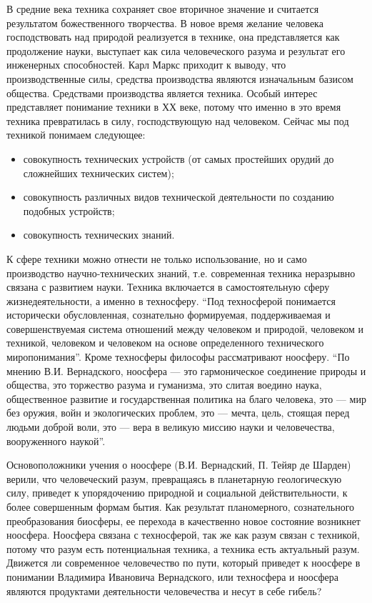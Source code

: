 В средние века техника сохраняет свое вторичное значение и считается результатом божественного творчества. В новое время желание человека господствовать над природой реализуется в технике, она представляется как продолжение науки, выступает как сила человеческого разума и результат его инженерных способностей. Карл Маркс приходит к выводу, что производственные силы, средства производства являются изначальным базисом общества. Средствами производства является техника. Особый интерес представляет понимание техники в ХХ веке, потому что именно в это время техника превратилась в силу, господствующую над человеком. Сейчас мы под техникой понимаем следующее:

\begin{itemize}
\item{совокупность технических устройств (от самых простейших орудий до сложнейших технических систем);}
\item{совокупность различных видов технической деятельности по созданию подобных устройств;}
\item{совокупность технических знаний.}
\end{itemize}

К сфере техники можно отнести не только использование, но и само производство научно-технических знаний, т.е. современная техника неразрывно связана с развитием науки. Техника включается в самостоятельную сферу жизнедеятельности, а именно в техносферу. ``Под техносферой понимается исторически обусловленная, сознательно формируемая, поддерживаемая и совершенствуемая система отношений между человеком и природой, человеком и техникой, человеком и человеком на основе определенного технического миропонимания''. Кроме техносферы философы рассматривают ноосферу. ``По мнению В.И. Вернадского, ноосфера — это гармоническое соединение природы и общества, это торжество разума и гуманизма, это слитая воедино наука, общественное развитие и государственная политика на благо человека, это — мир без оружия, войн и экологических проблем, это — мечта, цель, стоящая перед людьми доброй воли, это — вера в великую миссию науки и человечества, вооруженного наукой''.

Основоположники учения о ноосфере (В.И. Вернадский, П. Тейяр де Шарден) верили, что человеческий разум, превращаясь в планетарную геологическую силу, приведет к упорядочению природной и социальной действительности, к более совершенным формам бытия. Как результат планомерного, сознательного преобразования биосферы, ее перехода в качественно новое состояние возникнет ноосфера. Ноосфера связана с техносферой, так же как разум связан с техникой, потому что разум есть потенциальная техника, а техника есть актуальный разум. Движется ли современное человечество по пути, который приведет к ноосфере в понимании Владимира Ивановича Вернадского, или техносфера и ноосфера являются продуктами деятельности человечества и несут в себе гибель?

